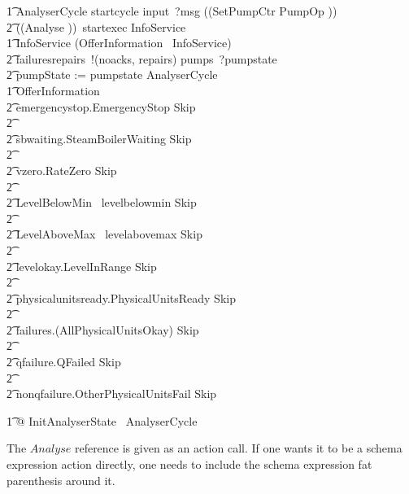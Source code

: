 \documentclass{report}
\newcommand{\lschexpract}{\left(\!\!\left(}
\newcommand{\rschexpract}{\right)\!\!\right)}
\newcommand{\lcircguard}{\left\langle}
\newcommand{\rcircguard}{\right\rangle}
\begin{document}
\begin{circusaction}
    \t1 AnalyserCycle \circdef startcycle \then input~?msg \then \lschexpract SetPumpCtr \land PumpOp \rschexpract \circseq \\
            \t2 \lschexpract Analyse \rschexpract \circseq\ startexec \then InfoService \\
    \t1 InfoService \circdef (OfferInformation \circseq\ InfoService) \extchoice \\
            \t2 failuresrepairs~!(noacks, repairs) \then pumps~?pumpstate \then \\
            \t2 pumpState := pumpstate \circseq AnalyserCycle \\
    \t1 OfferInformation \circdef \\
            \t2 emergencystop.EmergencyStop \then Skip \\ \t2 \extchoice \\ %
            \t2 sbwaiting.SteamBoilerWaiting \then Skip \\ \t2 \extchoice \\
            \t2 vzero.RateZero \then Skip \\ \t2 \extchoice \\ %
            \t2 \lcircguard LevelBelowMin \rcircguard \circguard\ levelbelowmin \then Skip \\ \t2 \extchoice \\
            \t2 \lcircguard LevelAboveMax \rcircguard \circguard\ levelabovemax \then Skip \\ \t2 \extchoice \\ %
            \t2 levelokay.LevelInRange \then Skip \\ \t2 \extchoice \\ %
            \t2 physicalunitsready.PhysicalUnitsReady \then Skip \\ \t2 \extchoice  \\ %
            \t2 failures.(\lnot AllPhysicalUnitsOkay) \then Skip \\ \t2 \extchoice \\
            \t2 qfailure.QFailed \then Skip \\ \t2 \extchoice \\ %
            \t2 nonqfailure.OtherPhysicalUnitsFail \then Skip \\
\end{circusaction}

\begin{circusaction}
    \t1 @ InitAnalyserState \circseq\ AnalyserCycle
\end{circusaction}
The $Analyse$ reference is given as an action call. If one wants it to be a schema expression action
directly, one needs to include the schema expression fat parenthesis around it.
\end{document}
